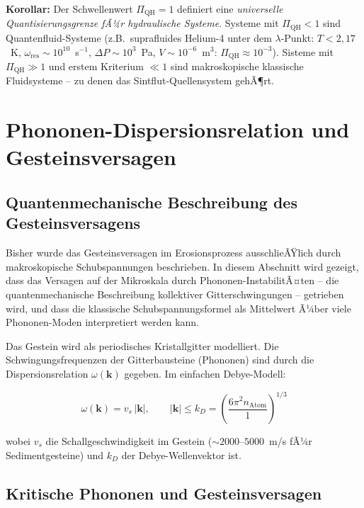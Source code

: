 ﻿\documentclass[12pt,a4paper]{report}
\begin{document}
\textbf{Korollar:} Der Schwellenwert $\Pi_\mathrm{QH} = 1$ definiert eine \textit{universelle Quantisierungsgrenze fÃ¼r hydraulische Systeme}. Systeme mit $\Pi_\mathrm{QH} < 1$ sind Quantenfluid-Systeme (z.B.\ suprafluides Helium-4 unter dem $\lambda$-Punkt: $T < 2{,}17$~K, $\omega_\mathrm{res} \sim 10^{10}$~s$^{-1}$, $\Delta P \sim 10^3$~Pa, $V \sim 10^{-6}$~m$^3$: $\Pi_\mathrm{QH} \approx 10^{-3}$). Sisteme mit $\Pi_\mathrm{QH} \gg 1$ und erstem Kriterium $\ll 1$ sind makroskopische klassische Fluidsysteme -- zu denen das Sintflut-Quellensystem gehÃ¶rt.

\section{Phononen-Dispersionsrelation und Gesteinsversagen}
\label{sec:phononen}

\subsection{Quantenmechanische Beschreibung des Gesteinsversagens}

Bisher wurde das Gesteinsversagen im Erosionsprozess ausschlieÃŸlich durch makroskopische Schubspannungen beschrieben. In diesem Abschnitt wird gezeigt, dass das Versagen auf der Mikroskala durch Phononen-InstabilitÃ¤ten -- die quantenmechanische Beschreibung kollektiver Gitterschwingungen -- getrieben wird, und dass die klassische Schubspannungsformel als Mittelwert Ã¼ber viele Phononen-Moden interpretiert werden kann.

Das Gestein wird als periodisches Kristallgitter modelliert. Die Schwingungsfrequenzen der Gitterbausteine (Phononen) sind durch die Dispersionsrelation $\omega(\mathbf{k})$ gegeben. Im einfachen Debye-Modell:

\begin{equation}
	\omega(\mathbf{k}) = v_s\,|\mathbf{k}|, \qquad |\mathbf{k}| \leq k_D = \left(\frac{6\pi^2 n_\mathrm{Atom}}{1}\right)^{1/3}
	\label{eq:debye_dispersion}
\end{equation}

wobei $v_s$ die Schallgeschwindigkeit im Gestein ($\sim 2000$--$5000$~m/s fÃ¼r Sedimentgesteine) und $k_D$ der Debye-Wellenvektor ist.

\subsection{Kritische Phononen und Gesteinsversagen}
\end{document}
